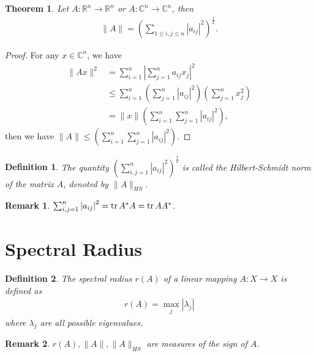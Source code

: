 \documentclass[11pt]{book}
\newtheorem{definition}{Definition}[section]
\newtheorem{theorem}{Theorem}[section]
\newtheorem{remark}{Remark}[section]
\theoremstyle{definition}
\numberwithin{equation}{subsection}
\begin{document}
\medskip

\begin{theorem}
Let $A:\mathbb{R}^n \to \mathbb{R}^n$ or $A:\mathbb{C}^n \to \mathbb{C}^n$, then 
\begin{align*}
    \|A\| = \left(\sum_{1\leq i,j\leq n} \left|a_{ij}\right|^2\right)^{\frac{1}{2}}.
\end{align*}
\end{theorem}
\begin{proof}
For any $x\in \mathbb{C}^n$, we have
\begin{align*}
    \|Ax\|^2 & = \sum^n_{i=1} \left|\sum^n_{j=1}a_{ij} x_j\right|^2 \\
    & \leq \sum^n_{i=1} \left(\sum^n_{j=1}\left|a_{ij}\right|^2 \right) \left(\sum^n_{j=1} x_j^2 \right) \\
    & = \|x\| \left(\sum^n_{i=1}\sum^n_{j=1}\left|a_{ij}\right|^2 \right),
\end{align*}
then we have $\|A\|\leq \left(\sum^n_{i=1}\sum^n_{j=1}\left|a_{ij}\right|^2 \right)$.
\end{proof}

\begin{definition}
The quantity $\left(\sum^n_{i,j=1}\left|a_{ij}\right|^2 \right)^{\frac{1}{2}}$ is called the Hilbert-Schmidt norm of the matrix $A$, denoted by $\|A\|_{HS}$. 
\end{definition}

\begin{remark}
$\sum^n_{i,j=1}\left|a_{ij}\right|^2 = \tr A^*A = \tr AA^*$.
\end{remark}

\medskip

\section{Spectral Radius}

\begin{definition}
The spectral radius $r(A)$ of a linear mapping $A:X\to X$ is defined as
\begin{align*}
    r(A) = \max_{j} \left|\lambda_j \right|
\end{align*}
where $\lambda_j$ are all possible eigenvalues.
\end{definition}

\begin{remark}
$r(A), \|A\|, \|A\|_{HS}$ are measures of the sign of $A$.
\end{remark}

\medskip
\end{document}
